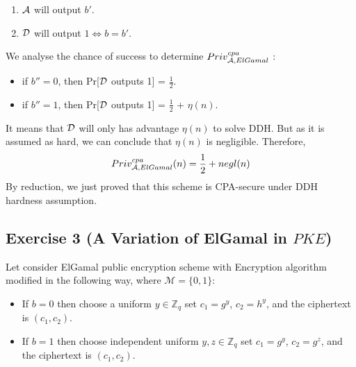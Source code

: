 \begin{solution}
\begin{enumerate}
\begin{enumerate}
        \item $\mathcal{A}$ will output $b'$.
        \item $\mathcal{D}$ will output $ 1 \Leftrightarrow b = b'$.
    \end{enumerate}
    We analyse the chance of success to determine $Priv^{cpa}_{\mathcal{A}, ElGamal}$ : 
    \begin{itemize}
        \item if $b'' = 0$, then Pr[$\mathcal{D}$ outputs 1] = $\frac{1}{2}$.
        \item if $b'' = 1$, then Pr[$\mathcal{D}$ outputs 1] = $\frac{1}{2}$ + $\eta(n)$.
    \end{itemize}
    It means that $\mathcal{D}$ will only has advantage $\eta(n)$ to solve DDH. But as it is assumed as hard, we can conclude that $\eta(n)$ is negligible. Therefore, $$Priv^{cpa}_{\mathcal{A}, ElGamal}(n) = \frac{1}{2} + negl(n) $$
    By reduction, we just proved that this scheme is CPA-secure under DDH hardness assumption.
\end{enumerate}
\end{solution}


\subsection{Exercise 3 (A Variation of ElGamal in \texorpdfstring{$PKE$}{PKE})}
\label{subsec:varia-elgamal-pke}
Let consider ElGamal public encryption scheme with Encryption algorithm modified in the following way, where $\mathcal{M}=\{0,1\}$:
\begin{itemize}
	\item If $b=0$ then choose a uniform $y\in \mathbb{Z}_{q}$ set $c_1=g^y$, $c_2=h^y$, and the ciphertext is $(c_1,c_2)$.
	\item If $b=1$ then choose independent uniform $y,z \in \mathbb{Z}_{q}$ set $c_1=g^y$, $c_2=g^z$, and the ciphertext is $(c_1,c_2)$.
\end{itemize}


